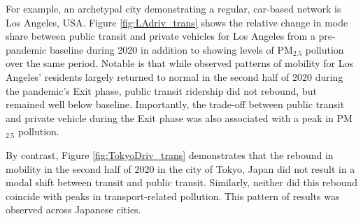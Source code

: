 \documentclass[preprint,12pt]{elsarticle}
\begin{document}
For example, an archetypal city demonstrating a regular, car-based network is Los Angeles, USA. Figure \ref{fig:LAdriv_trans} shows the relative change in mode share between public transit and private vehicles for Los Angeles from a pre-pandemic baseline during 2020 in addition to showing levels of PM$_{2.5}$ pollution over the same period. Notable is that while observed patterns of mobility for Los Angeles' residents largely returned to normal in the second half of 2020 during the pandemic's Exit phase, public transit ridership did not rebound, but remained well below baseline. Importantly, the trade-off between public transit and private vehicle during the Exit phase was also associated with a peak in PM$_{2.5}$ pollution.

By contrast, Figure \ref{fig:TokyoDriv_trans} demonstrates that the rebound in mobility in the second half of 2020 in the city of Tokyo, Japan did not result in a modal shift between transit and public transit. Similarly, neither did this rebound coincide with peaks in transport-related pollution. This pattern of results was observed across Japanese cities. 
\end{document}
